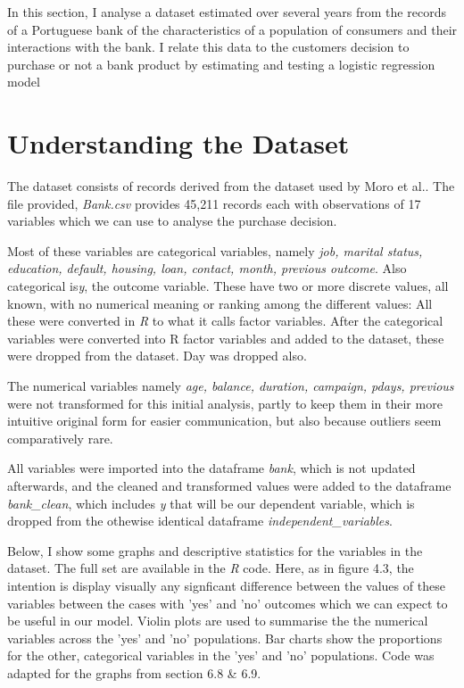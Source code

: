 \documentclass[9pt,technote]{IEEEtran}
\begin{document}
In this section, I analyse a dataset estimated over several years from the records of a Portuguese bank of the characteristics of a population of consumers and their interactions with the bank.  I relate this data to the customers decision to purchase or not a bank product by estimating and testing a logistic regression model   

\section{Understanding the Dataset}

The dataset consists of records derived from the dataset used by Moro et al.\cite{moro14}.  The file provided, \textit{Bank.csv} provides 45,211 records each with observations of 17 variables which we can use to analyse the purchase decision.  

Most of these variables are categorical variables, namely \textit{job, marital status, education, default, housing, loan, contact, month, previous outcome}.  Also categorical is\textit{y}, the outcome variable.  These have two or more discrete values, all known, with no numerical meaning or ranking among the different values: All these were converted in \textit{R} to what it calls factor variables.  After the categorical variables were converted into R factor variables and added to the dataset, these were dropped from the dataset.  Day was dropped also.  

The numerical variables namely \textit{age, balance, duration, campaign, pdays, previous} were not transformed for this initial analysis, partly to keep them in their more intuitive original form for easier communication, but also because outliers seem comparatively rare.  

All variables were imported into the dataframe \textit{bank}, which is not updated afterwards, and the cleaned and transformed values were added to the dataframe \textit{bank\_clean}, which includes \textit{y} that will be our dependent variable, which is dropped from the othewise identical dataframe \textit{independent\_variables}.  

Below, I show some graphs and descriptive statistics for the variables in the dataset. The full set are available in the \textit{R} code.  Here, as in \cite{hastie21} figure 4.3, the intention is display visually any signficant difference between the values of these variables between the cases with 'yes' and 'no' outcomes which we can expect to be useful in our model.  Violin plots are used to summarise the the numerical variables across the 'yes' and 'no' populations.  Bar charts show the proportions for the other, categorical variables in the 'yes' and 'no' populations.  Code was adapted for the graphs from \cite{chang19} section 6.8 \& 6.9. 
\end{document}
